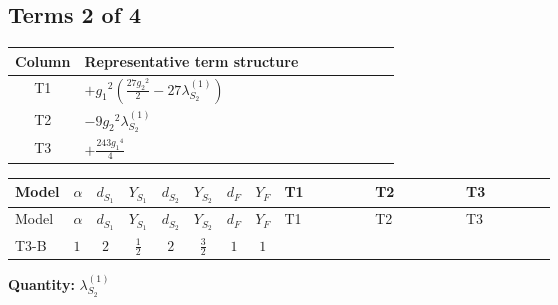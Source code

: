 \documentclass[8pt]{article}
\begin{document}
\begin{landscape}
\subsection*{Terms 2 of 4}
\begin{center}
\begin{tabular}{@{}c >{\raggedright\arraybackslash}p{0.82\linewidth}@{}}
\toprule
Column & Representative term structure \\
\midrule
T1 & \(\displaystyle +{g_1}^2 \left(\frac{27 {g_2}^2}{2}-27 {\lambda_{S_2}^{(1)}}\right)\) \\
\midrule
T2 & \(\displaystyle -9 {g_2}^2 {\lambda_{S_2}^{(1)}}\) \\
\midrule
T3 & \(\displaystyle +\frac{243 {g_1}^4}{4}\) \\
\midrule
\bottomrule
\end{tabular}
\end{center}
\smallskip
\tiny
\begin{longtable}{@{}llcccccc >{\raggedright\arraybackslash}p{0.21\linewidth} >{\raggedright\arraybackslash}p{0.21\linewidth} >{\raggedright\arraybackslash}p{0.21\linewidth}@{}}
\toprule
Model & $\alpha$ & $d_{S_1}$ & $Y_{S_1}$ & $d_{S_2}$ & $Y_{S_2}$ & $d_F$ & $Y_F$ & T1 & T2 & T3 \\
\midrule
\endfirsthead
\toprule
Model & $\alpha$ & $d_{S_1}$ & $Y_{S_1}$ & $d_{S_2}$ & $Y_{S_2}$ & $d_F$ & $Y_F$ & T1 & T2 & T3 \\
\midrule
\endhead
T3-B & $1$ & $2$ & $\frac{1}{2}$ & $2$ & $\frac{3}{2}$ & $1$ & $1$ & \scriptsize\adjustbox{max width=\linewidth}{$\begin{gathered} +{g_1}^2 \left(\frac{27 {g_2}^2}{2}-27 {\lambda_{S_2}^{(1)}}\right)\end{gathered}$} & \scriptsize\adjustbox{max width=\linewidth}{$\begin{gathered} -9 {g_2}^2 {\lambda_{S_2}^{(1)}}\end{gathered}$} & \scriptsize\adjustbox{max width=\linewidth}{$\begin{gathered} +\frac{243 {g_1}^4}{4}\end{gathered}$} \\
\midrule
\bottomrule
\end{longtable}
\clearpage
\noindent\textbf{Quantity: }$\lambda_{S_2}^{(1)}$\par\smallskip

\end{landscape}
\end{document}
